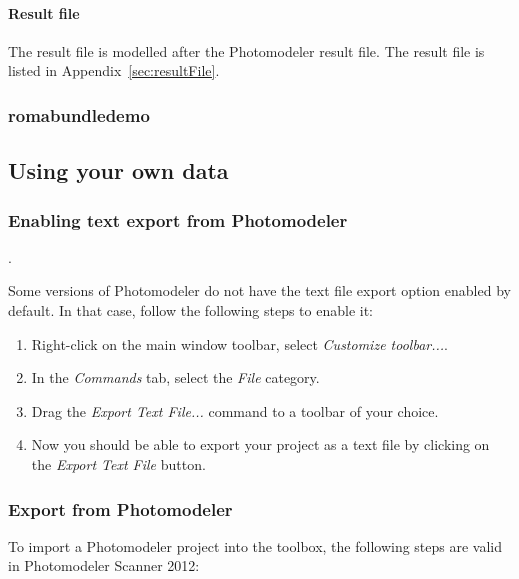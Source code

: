 \documentclass{article}
\begin{document}
\paragraph{Result file}

The result file is modelled after the Photomodeler result file.
The result file is listed in Appendix~\ref{sec:resultFile}.

\subsubsection{romabundledemo}

\newpage
\subsection{Using your own data}

\subsubsection{Enabling text export from Photomodeler}
\label{sec:enableTextExport}.

Some versions of Photomodeler do not have the text file export option
enabled by default. In that case, follow the following steps to enable
it:
\begin{enumerate}
\item Right-click on the main window toolbar, select \emph{Customize toolbar...}.
\item In the \emph{Commands} tab, select the \emph{File} category.
\item Drag the \emph{Export Text File...} command to a toolbar of
  your choice.
\item Now you should be able to export your project as a text file by
  clicking on the \emph{Export Text File} button.
\end{enumerate}

\subsubsection{Export from Photomodeler}

To import a Photomodeler project into the toolbox, the following
steps are valid in Photomodeler Scanner 2012:
\end{document}
